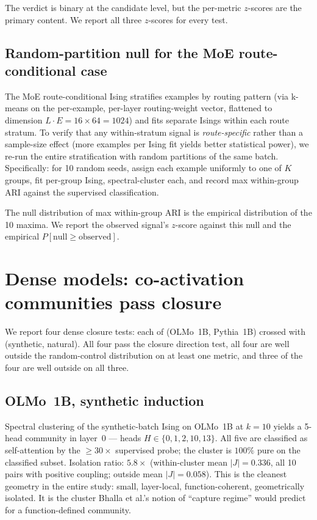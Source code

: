 \documentclass[11pt]{article}
\begin{document}
The verdict is binary at the candidate level, but the per-metric $z$-scores
are the primary content. We report all three $z$-scores for every test.

\subsection{Random-partition null for the MoE route-conditional case}
\label{sec:null-protocol}

The MoE route-conditional Ising stratifies examples by routing pattern
(via k-means on the per-example, per-layer routing-weight vector, flattened
to dimension $L \cdot E = 16 \times 64 = 1024$) and fits separate Isings
within each route stratum. To verify that any within-stratum signal is
\emph{route-specific} rather than a sample-size effect (more examples per
Ising fit yields better statistical power), we re-run the entire
stratification with random partitions of the same batch. Specifically: for
10 random seeds, assign each example uniformly to one of $K$ groups, fit
per-group Ising, spectral-cluster each, and record max within-group ARI
against the supervised classification.

The null distribution of max within-group ARI is the empirical distribution
of the 10 maxima. We report the observed signal's $z$-score against this
null and the empirical $P[\text{null} \geq \text{observed}]$.

\section{Dense models: co-activation communities pass closure}
\label{sec:dense}

We report four dense closure tests: each of (OLMo~1B, Pythia~1B) crossed
with (synthetic, natural). All four pass the closure direction test, all
four are well outside the random-control distribution on at least one
metric, and three of the four are well outside on all three.

\subsection{OLMo~1B, synthetic induction}
\label{sec:olmo-synthetic}

Spectral clustering of the synthetic-batch Ising on OLMo~1B at $k=10$
yields a 5-head community in layer~0 --- heads
$H \in \{0, 1, 2, 10, 13\}$. All five are classified as self-attention by
the $\geq 30\times$ supervised probe; the cluster is $100\%$ pure on the
classified subset. Isolation ratio: $5.8\times$ (within-cluster mean
$|J| = 0.336$, all 10 pairs with positive coupling; outside mean
$|J| = 0.058$). This is the cleanest geometry in the entire study: small,
layer-local, function-coherent, geometrically isolated. It is the cluster
Bhalla et al.'s notion of ``capture regime'' would predict for a
function-defined community.
\end{document}
